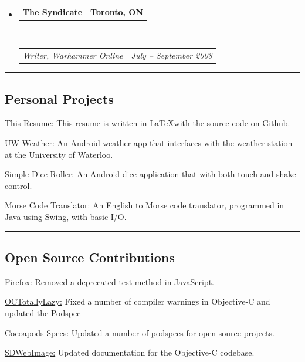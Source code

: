 \documentclass[10pt,letterpaper]{article}
\makeatletter
\newenvironment{indentsection}[1]%
{\begin{list}{}%
	{\setlength{\leftmargin}{#1}}%
	\item[]%
}
{\end{list}}
\newcommand{\headerrow}[2]
{\begin{tabular*}{\linewidth}{l@{\extracolsep{\fill}}r}
	#1 &
	#2 \\
\end{tabular*}}
\makeatother
\begin{document}
\begin{itemize}
	\item
	\headerrow
		{\textbf{\href{https://llts.org}{The Syndicate}}}
		{\textbf{Toronto, ON}}
	\\
	\headerrow
		{\emph{Writer, Warhammer Online}}
		{\emph{July -- September 2008}}

\end{itemize}

\hrule
\vspace{-0.4em}
\subsection*{Personal Projects}
	\begin{indentsection}{\parindent}
	\begin{description*}
		\item[\href{https://github.com/kapin/resume}{This Resume:}] This resume is written in \LaTeX with the source code on Github.
		\item[\href{https://github.com/Kapin/Waterloo-Weather}{UW Weather:}] An Android weather app that interfaces with the weather station at the University of Waterloo.
		\item[\href{https://github.com/Kapin/Dice-Roller}{Simple Dice Roller:}] An Android dice application that with both touch and shake control.	
		\item[\href{https://github.com/Kapin/Morse-Code-Translator}{Morse Code Translator:}] An English to Morse code translator, programmed in Java using Swing, with basic I/O.
	\end{description*}
	\end{indentsection}

\hrule
\vspace{-0.4em}
\subsection*{Open Source Contributions}
	\begin{indentsection}{\parindent}
	\begin{description*}
		\item[\href{https://mozilla.org}{Firefox:}] Removed a deprecated test method in JavaScript.
		\item[\href{https://github.com/stuartervine/octotallylazy}{OCTotallyLazy:}] Fixed a number of compiler warnings in Objective-C and updated the Podspec
		\item[\href{https://github.com/CocoaPods/Specs}{Cocoapods Specs:}]  Updated a number of podspecs for open source projects.	
		\item[\href{https://github.com/rs/sdwebimage}{SDWebImage:}] Updated documentation for the Objective-C codebase.
	\end{description*}
	\end{indentsection}
\end{document}
